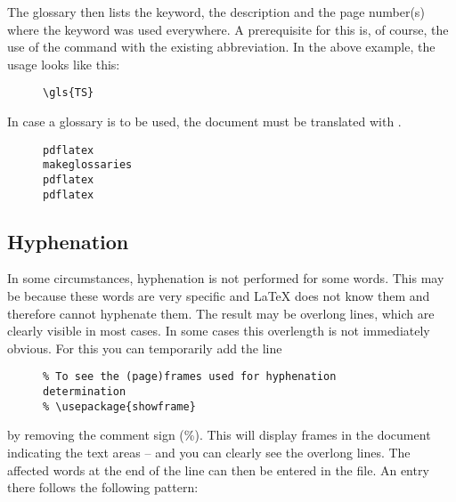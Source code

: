 The glossary then lists the keyword, the description and the page number(s)
where the keyword was used everywhere. A prerequisite for this is, of course,
the use of the command  with the
existing abbreviation. In the above example, the usage looks like this:

\begin{figure}[H]
    \small
    \centering
    \begin{BVerbatim}
\gls{TS}
    \end{BVerbatim}
\end{figure}

In case a glossary is to be used, the document must be translated with
.

\begin{figure}[H]
    \small
    \centering
    \begin{BVerbatim}
pdflatex
makeglossaries
pdflatex
pdflatex
    \end{BVerbatim}
\end{figure}

\subsection{Hyphenation}

In some circumstances, hyphenation is not performed for some words. This may
be because these words are very specific and \LaTeX{} does not know them and
therefore cannot hyphenate them. The result may be overlong lines, which are
clearly visible in most cases. In some cases this overlength is not
immediately obvious. For this you can temporarily add the line

\begin{figure}[H]
    \small
    \centering
    \begin{BVerbatim}
    \end{BVerbatim}
\end{figure}

by removing the comment sign (\%). This will display frames in the document
indicating the text areas -- and you can clearly see the overlong lines. The
affected words at the end of the line can then be entered in the
 file. An entry there follows the following
pattern:

